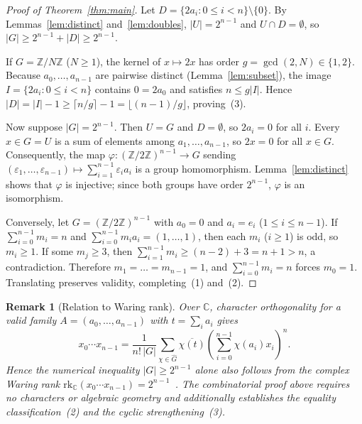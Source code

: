 \documentclass[11pt]{article}
\newtheorem{remark}{Remark}
\begin{document}
\begin{proof}[Proof of Theorem~\ref{thm:main}]
Let $D = \{2a_i : 0 \le i < n\} \setminus \{0\}$. By Lemmas~\ref{lem:distinct} and~\ref{lem:doubles}, $|U| = 2^{n-1}$ and $U \cap D = \emptyset$, so $|G| \ge 2^{n-1} + |D| \ge 2^{n-1}$.

If $G = \mathbb{Z}/N\mathbb{Z}$ ($N \ge 1$), the kernel of $x \mapsto 2x$ has order $g = \gcd(2, N) \in \{1, 2\}$. Because $a_0, \dots, a_{n-1}$ are pairwise distinct (Lemma~\ref{lem:subset}), the image $I = \{2a_i : 0 \le i < n\}$ contains $0 = 2a_0$ and satisfies $n \le g|I|$. Hence $|D| = |I| - 1 \ge \lceil n/g \rceil - 1 = \lfloor (n - 1)/g \rfloor$, proving~(3).

Now suppose $|G| = 2^{n-1}$. Then $U = G$ and $D = \emptyset$, so $2a_i = 0$ for all $i$. Every $x \in G = U$ is a sum of elements among $a_1, \dots, a_{n-1}$, so $2x = 0$ for all $x \in G$. Consequently, the map $\varphi : (\mathbb{Z}/2\mathbb{Z})^{n-1} \to G$ sending $(\varepsilon_1, \dots, \varepsilon_{n-1}) \mapsto \sum_{i=1}^{n-1} \varepsilon_i a_i$ is a group homomorphism. Lemma~\ref{lem:distinct} shows that $\varphi$ is injective; since both groups have order $2^{n-1}$, $\varphi$ is an isomorphism.

Conversely, let $G = (\mathbb{Z}/2\mathbb{Z})^{n-1}$ with $a_0 = 0$ and $a_i = e_i$ ($1 \le i \le n-1$). If $\sum_{i=0}^{n-1} m_i = n$ and $\sum_{i=0}^{n-1} m_i a_i = (1, \dots, 1)$, then each $m_i$ ($i \ge 1$) is odd, so $m_i \ge 1$. If some $m_j \ge 3$, then $\sum_{i=1}^{n-1} m_i \ge (n - 2) + 3 = n + 1 > n$, a contradiction. Therefore $m_1 = \dots = m_{n-1} = 1$, and $\sum_{i=0}^{n-1} m_i = n$ forces $m_0 = 1$. Translating preserves validity, completing~(1) and~(2).
\end{proof}

\begin{remark}[Relation to Waring rank]
Over $\mathbb{C}$, character orthogonality for a valid family $A = (a_0, \dots, a_{n-1})$ with $t = \sum_i a_i$ gives
\[
x_0 \cdots x_{n-1} = \frac{1}{n!\,|G|} \sum_{\chi \in \widehat{G}} \overline{\chi(t)} \left(\sum_{i=0}^{n-1} \chi(a_i) x_i\right)^n.
\]
Hence the numerical inequality $|G| \ge 2^{n-1}$ alone also follows from the complex Waring rank $\mathrm{rk}_{\mathbb{C}}(x_0 \cdots x_{n-1}) = 2^{n-1}$~\cite[Corollary~3.3]{ccg2012}. The combinatorial proof above requires no characters or algebraic geometry and additionally establishes the equality classification~(2) and the cyclic strengthening~(3).
\end{remark}
\end{document}
